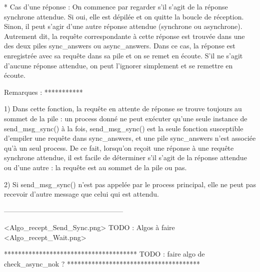 * Cas d'une réponse :
  On commence par regarder s'il s'agit de la réponse synchrone attendue. Si oui, elle est dépilée et
  on quitte la boucle de réception.
  Sinon, il peut s'agir d'une autre réponse attendue (synchrone ou asynchrone). Autrement dit, la
  requête correspondante à cette réponse est trouvée dans une des deux piles sync_answers ou
  async_answers.
  Dans ce cas, la réponse est enregistrée avec sa requête dans sa pile et on se remet en écoute.
  S'il ne s'agit d'aucune réponse attendue, on peut l'ignorer simplement et se remettre en écoute.

Remarques :
***********

1)
Dans cette fonction, la requête en attente de réponse se trouve toujours au sommet de la pile :
un process donné ne peut exécuter qu'une seule instance de send_msg_sync() à la fois, send_msg_sync()
est la seule fonction susceptible d'empiler une requête dans sync_answers, et une pile sync_answers
n'est associée qu'à un seul process.
De ce fait, lorsqu'on reçoit une réponse à une requête synchrone attendue, il est facile de déterminer
s'il s'agit de la réponse attendue ou d'une autre : la requête est au sommet de la pile ou pas.

2)
Si send_msg_sync() n'est pas appelée par le process principal, elle ne peut pas recevoir d'autre
message que celui qui est attendu.

---------------------------------------------------

<Algo_recept_Send_Sync.png>   TODO : Algos à faire
<Algo_recept_Wait.png>

**************************************
TODO : faire algo de check_async_nok ?
**************************************
